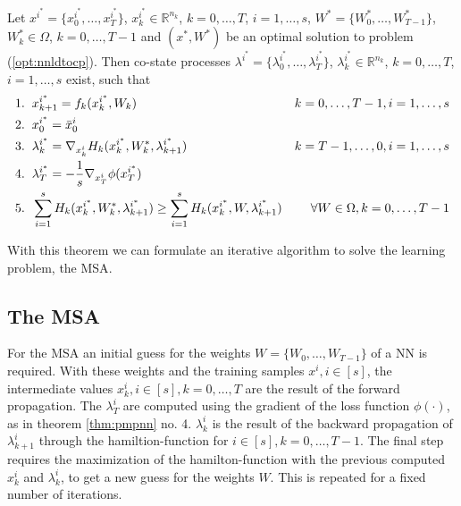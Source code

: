 \documentclass[a4paper, 12pt]{scrreprt} %
\begin{document}
\begin{myTheorem}
\label{thm:pmpnn}
Let $x^{i^*}=\{x_0^{i^*}, \dots,x_T^{i^*}\}$, $x_k^{i^*} \in \mathbb R^{n_k}$, $k = 0,\dots, T$, $i=1,\dots,s$, $W^* = \{W_0^*, \dots,W_{T-1}^*\}$, $W_k^*\in \Omega$, $k = 0, \dots, T-1$ and $(x^*,W^*)$ be an optimal solution to problem (\ref{opt:nnldtocp}). Then co-state processes $\lambda^{i^*} = \{\lambda_0^{i^*}, \dots, \lambda_T^{i^*}\}$, $\lambda_k^{i^*} \in \mathbb R^{n_k}$, $k=0,\dots,T$, $i=1,\dots,s$ exist, such that
\begin{align*}
1.&\hspace{0.2cm} x_{k+1}^{i^*} =  f_k(x_k^{i^*},W_k) &k=0,\dots,T-1, i=1,\dots,s \\
2.&\hspace{0.2cm} x_0^{i^*} = \bar x_0^i \\
3.&\hspace{0.2cm} \lambda_k^{i^*} = \nabla_{x_k^i} H_k(x_k^{i^*},W^*_k,\lambda_{k+1}^{i^*}) & k=T-1, \dots, 0, i=1,\dots,s \\
4.&\hspace{0.2cm} \lambda_T^{i^*} = - \frac{1}{s} \nabla_{x^i_T} \phi(x_T^{i^*}) \\
5.&\hspace{0.2cm} \sum_{i=1}^s{H_k(x_k^{i^*},W^*_k,\lambda_{k+1}^{i^*})} \geq \sum_{i=1}^s{H_k(x_k^{i^*},W,\lambda_{k+1}^{i^*})} & \forall W \in \Omega, k = 0,\dots, T-1
\end{align*}
\end{myTheorem}

With this theorem we can formulate an iterative algorithm to solve the learning problem, the \acf{MSA}.

\subsection{The \acl{MSA}}

For the \ac{MSA} an initial guess for the weights $W = \{W_0, \dots,W_{T-1}\}$ of a \ac{NN} is required. With these weights and the training samples $x^i, i \in [s]$, the intermediate values $x_k^i, i \in [s], k = 0,\dots,T$ are the result of the forward propagation. The $\lambda_T^i$ are computed using the gradient of the loss function $\phi(\cdot)$, as in theorem \ref{thm:pmpnn} no. 4. $\lambda_k^i$ is the result of the backward propagation of $\lambda_{k+1}^i$ through the hamiltion-function for $i\in [s], k=0,\dots,T-1$.
The final step requires the maximization of the hamilton-function with the previous computed $x_k^i$ and $\lambda_k^i$, to get a new guess for the weights $W$. This is repeated for a fixed number of iterations. \newline
\end{document}
